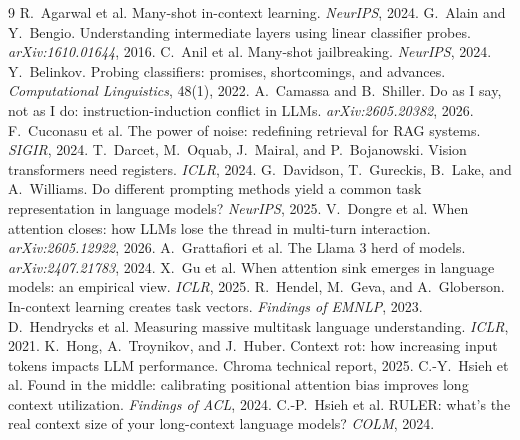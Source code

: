 \documentclass{article}
\begin{document}
\small
\begin{thebibliography}{9}
 R.~Agarwal et al. Many-shot in-context learning. \emph{NeurIPS}, 2024.
 G.~Alain and Y.~Bengio. Understanding intermediate layers using linear classifier probes. \emph{arXiv:1610.01644}, 2016.
 C.~Anil et al. Many-shot jailbreaking. \emph{NeurIPS}, 2024.
 Y.~Belinkov. Probing classifiers: promises, shortcomings, and advances. \emph{Computational Linguistics}, 48(1), 2022.
 A.~Camassa and B.~Shiller. Do as I say, not as I do: instruction-induction conflict in LLMs. \emph{arXiv:2605.20382}, 2026.
 F.~Cuconasu et al. The power of noise: redefining retrieval for RAG systems. \emph{SIGIR}, 2024.
 T.~Darcet, M.~Oquab, J.~Mairal, and P.~Bojanowski. Vision transformers need registers. \emph{ICLR}, 2024.
 G.~Davidson, T.~Gureckis, B.~Lake, and A.~Williams. Do different prompting methods yield a common task representation in language models? \emph{NeurIPS}, 2025.
 V.~Dongre et al. When attention closes: how LLMs lose the thread in multi-turn interaction. \emph{arXiv:2605.12922}, 2026.
 A.~Grattafiori et al. The Llama 3 herd of models. \emph{arXiv:2407.21783}, 2024.
 X.~Gu et al. When attention sink emerges in language models: an empirical view. \emph{ICLR}, 2025.
 R.~Hendel, M.~Geva, and A.~Globerson. In-context learning creates task vectors. \emph{Findings of EMNLP}, 2023.
 D.~Hendrycks et al. Measuring massive multitask language understanding. \emph{ICLR}, 2021.
 K.~Hong, A.~Troynikov, and J.~Huber. Context rot: how increasing input tokens impacts LLM performance. Chroma technical report, 2025.
 C.-Y.~Hsieh et al. Found in the middle: calibrating positional attention bias improves long context utilization. \emph{Findings of ACL}, 2024.
 C.-P.~Hsieh et al. RULER: what's the real context size of your long-context language models? \emph{COLM}, 2024.

\end{thebibliography}
\end{document}
